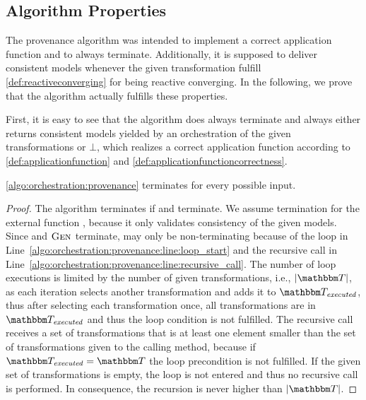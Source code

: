 \subsection{Algorithm Properties}

The provenance algorithm was intended to implement a correct application function and to always terminate.
Additionally, it is supposed to deliver consistent models whenever the given transformation fulfill \autoref{def:reactiveconverging} for being reactive converging.
In the following, we prove that the algorithm actually fulfills these properties.

First, it is easy to see that the algorithm does always terminate and always either returns consistent models yielded by an orchestration of the given transformations or $\bot$, which realizes a correct application function according to \autoref{def:applicationfunction} and \autoref{def:applicationfunctioncorrectness}.

\begin{theorem}
    \autoref{algo:orchestration:provenance} terminates for every possible input.
\end{theorem}
\begin{proof}
    The algorithm terminates if  and  terminate.
    We assume termination for the external function , because it only validates consistency of the given models.
    Since  and $\textsc{Gen}_{}$ terminate,  may only be non-terminating because of the loop in Line~\ref{algo:orchestration:provenance:line:loop_start} and the recursive call in Line~\ref{algo:orchestration:provenance:line:recursive_call}.
    The number of loop executions is limited by the number of given transformations, i.e., $\abs{\transformationset{T}}$, as each iteration selects another transformation and adds it to $\provalgexecuted$, thus after selecting each transformation once, all transformations are in $\provalgexecuted$ and thus the loop condition is not fulfilled.
    The recursive call receives a set of transformations that is at least one element smaller than the set of transformations given to the calling method, because if $\provalgexecuted = \transformationset{T}$ the loop precondition is not fulfilled. If the given set of transformations is empty, the loop is not entered and thus no recursive call is performed. In consequence, the recursion is never higher than $\abs{\transformationset{T}}$.
\end{proof}


